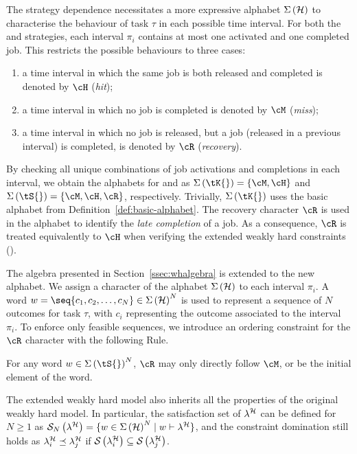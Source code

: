 The strategy dependence necessitates a more expressive alphabet $\Sigma\left( \mathcal{H} \right)$ to characterise the behaviour of task $\tau$ in each possible time interval.
For both the \tK{} and \tS{} strategies, each interval $\pi_i$ contains at most one activated and one completed job.
This restricts the possible behaviours to three cases:
%
\begin{enumerate}[label=(\roman*)]
    \item a time interval in which the same job is both released and completed is denoted by $\cH$ (\emph{hit});
    \item a time interval in which no job is completed is denoted by $\cM$ (\emph{miss});
    \item a time interval in which no job is released, but a job (released in a previous interval) is completed, is denoted by $\cR$ (\emph{recovery}).
\end{enumerate}
%
By checking all unique combinations of job activations and completions in each interval, we obtain the alphabets for \tK{} and \tS{} as $\Sigma\left(\text{\tK{}}\right) = \{ \cM, \cH \}$ and $\Sigma\left(\text{\tS{}}\right) = \{ \cM, \cH, \cR \}$, respectively.
Trivially, $\Sigma\left(\text{\tK{}}\right)$ uses the basic alphabet from Definition~\ref{def:basic-alphabet}.
The recovery character $\cR$ is used in the \tS{} alphabet to identify the \emph{late completion} of a job.
As a consequence, $\cR$ is treated equivalently to $\cH$ when verifying the extended weakly hard constraints (\ewhc{}).

The algebra presented in Section~\ref{ssec:whalgebra} is extended to the new alphabet.
We assign a character of the alphabet $\Sigma\left(\mathcal{H}\right)$ to each interval $\pi_i$.
A word $w = \seq{c_1,c_2,\dots,c_N} \in \Sigma\left(\strat\right)^N$ is used to represent a sequence of $N$ outcomes for task $\tau$, with $c_i$ representing the outcome associated to the interval $\pi_i$. 
To enforce only feasible sequences, we introduce an ordering constraint for the $\cR$ character with the following Rule.
%
\begin{rule_}%
    \label{rule:R}%
    For any word $w \in \Sigma\left(\text{\tS{}}\right)^N$, $\cR$ may only directly follow $\cM$, or be the initial element of the word.
\end{rule_}

The extended weakly hard model also inherits all the properties of the original weakly hard model.
In particular, the satisfaction set of $\lambda^{\mathcal{H}}$ can be defined for $N\geq 1$ as $\mathcal{S}_{N}\left( \lambda^{\mathcal{H}} \right) = \{ w \in \Sigma\left(\mathcal{H}\right)^N \mid w \vdash \lambda^{\mathcal{H}} \}$, and the constraint domination still holds as $\lambda^{\mathcal{H}}_{i} \preceq \lambda^{\mathcal{H}}_{j}$ if $\mathcal{S}_{}\left( \lambda^{\mathcal{H}}_{i}  \right) \subseteq \mathcal{S}_{}\left( \lambda^{\mathcal{H}}_{j} \right)$.
